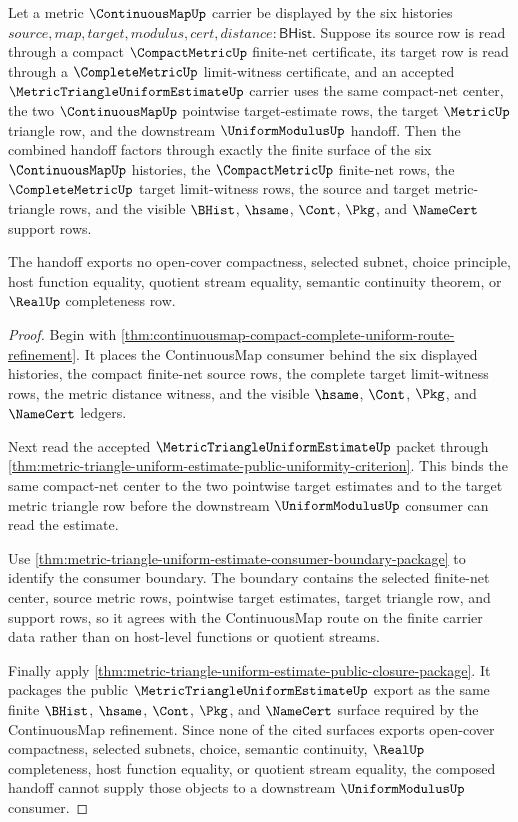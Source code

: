 \begin{theorem}
\label{thm:continuousmap-compactmetric-metric-triangle-handoff}
Let a metric $\ContinuousMapUp$ carrier be displayed by the six histories
$source,map,target,modulus,cert,distance:\mathsf{BHist}$. Suppose its source
row is read through a compact $\CompactMetricUp$ finite-net certificate, its
target row is read through a $\CompleteMetricUp$ limit-witness certificate,
and an accepted $\MetricTriangleUniformEstimateUp$ carrier uses the same
compact-net center, the two $\ContinuousMapUp$ pointwise target-estimate rows,
the target $\MetricUp$ triangle row, and the downstream $\UniformModulusUp$
handoff. Then the combined handoff factors through exactly the finite surface
of the six $\ContinuousMapUp$ histories, the $\CompactMetricUp$ finite-net
rows, the $\CompleteMetricUp$ target limit-witness rows, the source and target
metric-triangle rows, and the visible $\BHist$, $\hsame$, $\Cont$, $\Pkg$, and
$\NameCert$ support rows.

The handoff exports no open-cover compactness, selected subnet, choice
principle, host function equality, quotient stream equality, semantic
continuity theorem, or $\RealUp$ completeness row.
\end{theorem}
\begin{proof}
Begin with
\autoref{thm:continuousmap-compact-complete-uniform-route-refinement}. It
places the ContinuousMap consumer behind the six displayed histories, the
compact finite-net source rows, the complete target limit-witness rows, the
metric distance witness, and the visible $\hsame$, $\Cont$, $\Pkg$, and
$\NameCert$ ledgers.

Next read the accepted $\MetricTriangleUniformEstimateUp$ packet through
\autoref{thm:metric-triangle-uniform-estimate-public-uniformity-criterion}.
This binds the same compact-net center to the two pointwise target estimates
and to the target metric triangle row before the downstream
$\UniformModulusUp$ consumer can read the estimate.

Use
\autoref{thm:metric-triangle-uniform-estimate-consumer-boundary-package} to
identify the consumer boundary. The boundary contains the selected finite-net
center, source metric rows, pointwise target estimates, target triangle row,
and support rows, so it agrees with the ContinuousMap route on the finite
carrier data rather than on host-level functions or quotient streams.

Finally apply
\autoref{thm:metric-triangle-uniform-estimate-public-closure-package}. It
packages the public $\MetricTriangleUniformEstimateUp$ export as the same
finite $\BHist$, $\hsame$, $\Cont$, $\Pkg$, and $\NameCert$ surface required by
the ContinuousMap refinement. Since none of the cited surfaces exports
open-cover compactness, selected subnets, choice, semantic continuity,
$\RealUp$ completeness, host function equality, or quotient stream equality,
the composed handoff cannot supply those objects to a downstream
$\UniformModulusUp$ consumer.
\end{proof}
